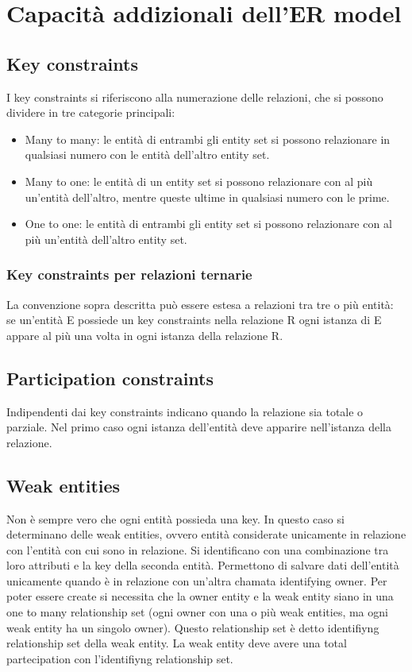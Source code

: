 \section{Capacit\`a addizionali dell'ER model}
\subsection{Key constraints}
I key constraints si riferiscono alla numerazione delle relazioni, che si possono dividere in tre categorie principali:
\begin{itemize}
\item Many to many: le entit\`a di entrambi gli entity set si possono relazionare in qualsiasi numero con le entit\`a dell'altro entity set.
\item Many to one: le entit\`a di un entity set si possono relazionare con al pi\`u un'entit\`a dell'altro, mentre queste ultime in qualsiasi numero con le prime.
\item One to one: le entit\`a di entrambi gli entity set si possono relazionare con al pi\`u un'entit\`a dell'altro entity set.
\end{itemize}
\subsubsection{Key constraints per relazioni ternarie}
La convenzione sopra descritta pu\`o essere estesa a relazioni tra tre o pi\`u entit\`a: se un'entit\`a E possiede un key constraints nella relazione R ogni istanza di E appare al pi\`u una volta in ogni istanza della 
relazione R. 
\subsection{Participation constraints}
Indipendenti dai key constraints indicano quando la relazione sia totale o parziale. Nel primo caso ogni istanza dell'entit\`a deve apparire nell'istanza della relazione. 
\subsection{Weak entities}
Non \`e sempre vero che ogni entit\`a possieda una key. In questo caso si determinano delle weak entities, ovvero entit\`a considerate unicamente in relazione con l'entit\`a con cui sono in relazione. Si 
identificano con una combinazione tra loro attributi e la key della seconda entit\`a. Permettono di salvare dati dell'entit\`a unicamente quando \`e in relazione con un'altra chamata identifying owner. Per poter 
essere create si necessita che la owner entity e la weak entity siano in una one to many relationship set (ogni owner con una o pi\`u weak entities, ma ogni weak entity ha un singolo owner). Questo relationship 
set \`e detto identifiyng relationship set della weak entity. La weak entity deve avere una total partecipation con l'identifiyng relationship set. 
